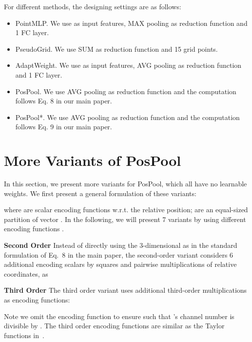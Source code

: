 \documentclass[runningheads]{llncs}
\begin{document}
For different methods, the designing settings are as follows:
\begin{itemize}
    \item PointMLP. We use  as input features, MAX pooling as reduction function and 1 FC layer.
    \item PseudoGrid. We use SUM as reduction function and 15 grid points.
    \item AdaptWeight. We use  as input features, AVG pooling as reduction function and 1 FC layer.
    \item PosPool. We use AVG pooling as reduction function and the computation follows Eq. 8 in our main paper.
    \item PosPool*.  We use AVG pooling as reduction function and the computation follows Eq. 9 in our main paper.
\end{itemize}

\section{More Variants of PosPool}

In this section, we present more variants for PosPool, which all have no learnable weights. We first present a general formulation of these variants:
\begin{small}
	
\end{small}where  are  scalar encoding functions w.r.t. the relative position;  are an equal-sized partition of vector . In the following, we will present 7 variants by using different encoding functions .

\vspace{0.3em} \noindent \textbf{Second Order} Instead of directly using the 3-dimensional  as in the standard formulation of Eq.~8 in the main paper, the second-order variant considers 6 additional encoding scalars by squares and pairwise multiplications of relative coordinates, as
\begin{small}
	
\end{small}

\vspace{0.3em} \noindent \textbf{Third Order} The third order variant uses additional third-order multiplications as encoding functions:
\begin{small}
	
\end{small}Note we omit the encoding function  to ensure  such that 's channel number  is divisible by . The third order encoding functions are similar as the Taylor functions in~\cite{xu2018spidercnn}.
\end{document}
